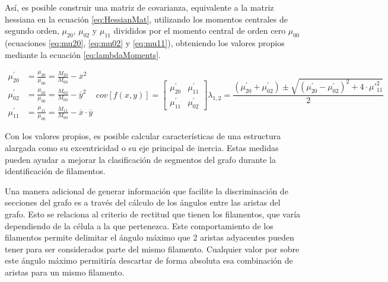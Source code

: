 As\'i, es posible construir una matriz de covarianza, equivalente a la matriz hessiana en la ecuaci\'on \ref{eq:HessianMat}, utilizando los momentos centrales de segundo orden, $\mu_{20}$, $\mu_{02}$ y $\mu_{11}$ divididos por el momento central de orden cero $\mu_{00}$ (ecuaciones \ref{eq:mu20}, \ref{eq:mu02} y \ref{eq:mu11}), obteniendo los valores propios mediante la ecuaci\'on \ref{eq:lambdaMoments}.

\begin{subequations}
\begin{align}
    \mu_{20}^{\prime} &= \frac{\mu_{20}}{\mu_{00}} = \frac{M_{20}}{M_{00}} - \overline{x}^{2} \label{eq:mu20} \\
    \mu_{02}^{\prime} &= \frac{\mu_{02}}{\mu_{00}} = \frac{M_{02}}{M_{00}} - \overline{y}^{2} \label{eq:mu02} \\
    \mu_{11}^{\prime} &= \frac{\mu_{11}}{\mu_{00}} = \frac{M_{11}}{M_{00}} - \overline{x}\cdot\overline{y} \label{eq:mu11}
\end{align}

\begin{equation}
    \label{eq:covMatLambda}
    cov[f(x,y)] = \begin{bmatrix}
        \mu_{20}^{\prime} & \mu_{11}^{\prime} \\
        \mu_{11}^{\prime} & \mu_{02}^{\prime} 
        \end{bmatrix}
\end{equation}

\begin{equation}
    \label{eq:lambdaMoments}
    \lambda_{1,2} = \dfrac{(\mu_{20}^{\prime} + \mu_{02}^{\prime}) \pm \sqrt{(\mu_{20}^{\prime} - \mu_{02}^{\prime})^{2} + 4\cdot \mu\prime_{11}^{2} }}{2}
\end{equation}
\end{subequations}

Con los valores propios, es posible calcular caracter\'isticas de una estructura alargada como su excentricidad o su eje principal de inercia. Estas medidas pueden ayudar a mejorar la clasificaci\'on de segmentos del grafo durante la identificaci\'on de filamentos.


Una manera adicional de generar informaci\'on que facilite la discriminaci\'on de secciones del grafo es a trav\'es del c\'alculo de los \'angulos entre las aristas del grafo. Esto se relaciona al criterio de rectitud que tienen los filamentos, que var\'ia dependiendo de la c\'elula a la que pertenezca. Este comportamiento de los filamentos permite delimitar el \'angulo m\'aximo que 2 aristas adyacentes pueden tener para ser considerados parte del mismo filamento. Cualquier valor por sobre este \'angulo m\'aximo permitir\'ia descartar de forma absoluta esa combinaci\'on de aristas para un mismo filamento. 


